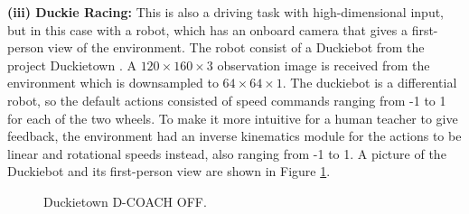 \textbf{(iii) Duckie Racing:} This is also a driving task with high-dimensional input, but in this case with a robot, which has an onboard camera that gives a first-person view of the environment. The robot consist of a Duckiebot from the project Duckietown \cite{Paull2017}. A $120\times160\times3$ observation image is received from the environment which is downsampled to $64\times64\times1$. The duckiebot is a differential robot, so the default actions consisted of speed commands ranging from -1 to 1 for each of the two wheels. To make it more intuitive for a human teacher to give feedback, the environment had an inverse kinematics module for the actions to be linear and rotational speeds instead, also ranging from -1 to 1. A picture of the Duckiebot and its first-person view are shown in Figure \ref{fig:duckietown_off}.

\begin{figure}[h]
\centering
{} 
\hspace{1.3cm}
\caption{Duckietown D-COACH OFF.} 
\label{fig:duckietown_off} 
\end{figure}

